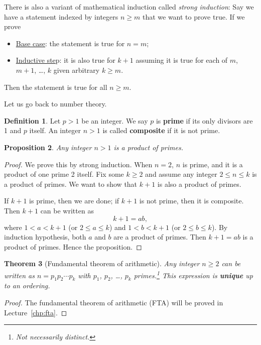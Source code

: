 \documentclass{amsbook}
\theoremstyle{plain}
\newtheorem{theorem}{Theorem}[chapter] %
\newtheorem{proposition}[theorem]{Proposition}
\theoremstyle{definition}
\newtheorem{definition}[theorem]{Definition}
\theoremstyle{remark}
\numberwithin{equation}{chapter}
\numberwithin{figure}{chapter}
\begin{document}
There is also a variant of mathematical induction called \emph{strong induction}: Say we have a statement indexed by integers $n \geqslant m$ that we want to prove true. If we prove
\begin{itemize}
\item \underline{Base case}: the statement is true for $n = m$;
\item \underline{Inductive ste}p: it is also true for $k+1$ assuming it is true for each of $m$, $m+1$, \ldots, $k$ given arbitrary $k \geqslant m$.
\end{itemize}
Then the statement is true for all $n \geqslant m$.

Let us go back to number theory. 
\begin{definition}
Let $p > 1$ be an integer. We say $p$ is \textbf{prime} if its only divisors are 1 and $p$ itself. An integer $n > 1$ is called \textbf{composite} if it is not prime.
\end{definition}

\begin{proposition}\label{prop:int_prod_prime}
Any integer $n > 1$ is a product of primes.
\end{proposition}
\begin{proof}
We prove this by strong induction. When $n = 2$, $n$ is prime, and it is a product of one prime 2 itself. Fix some $k \geqslant 2$ and assume any integer $2 \leqslant n \leqslant k$ is a product of primes. We want to show that $k+1$ is also a product of primes.

If $k+1$ is prime, then we are done; if $k+1$ is not prime, then it is composite. Then $k+1$ can be written as 
\[
k + 1 = ab,
\]
where $1 < a < k+1$ (or $2 \leqslant a \leqslant k$) and $1 < b < k+1$ (or $2 \leqslant b \leqslant k$). By induction hypothesis, both $a$ and $b$ are a product of primes. Then $k+1 = ab$ is a product of primes. Hence the proposition.
\end{proof}

\begin{theorem}[Fundamental theorem of arithmetic]
Any integer $n \geqslant 2$ can be written as $n = p_1 p_2 \cdots p_k$ with $p_1$, $p_2$, \ldots, $p_k$ primes.\footnote{Not necessarily distinct.} This expression is \textbf{unique} up to an ordering.
\end{theorem}
\begin{proof}
The fundamental theorem of arithmetic (FTA) will be proved in Lecture~\ref{chp:fta}.
\end{proof}
\end{document}
